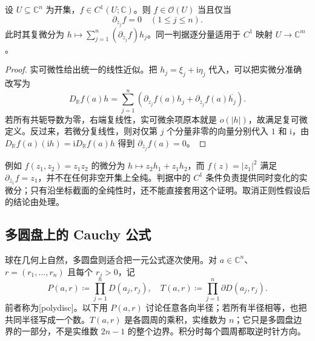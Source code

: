 \begin{proposition}\label{b3:prop:29-cauchy-riemann}
设 \(U\subseteq\mathbb C^n\) 为开集，\(f\in C^1(U;\mathbb C)\)。则 \(f\in\mathcal O(U)\) 当且仅当
\[
 \partial_{\bar z_j}f=0\quad(1\le j\le n).
\]
此时其复微分为 \(h\mapsto\sum_{j=1}^n(\partial_{z_j}f)h_j\)。同一判据逐分量适用于 \(C^1\) 映射 \(U\to\mathbb C^m\)。
\end{proposition}
\begin{proof}
实可微性给出统一的线性近似。把 \(h_j=\xi_j+\mathrm{i}\eta_j\) 代入，可以把实微分准确改写为
\[
 D_{\mathbb R}f(a)h
 =\sum_{j=1}^n\left(\partial_{z_j}f(a)h_j
                  +\partial_{\bar z_j}f(a)\overline{h_j}\right).
\]
若所有共轭导数为零，右端复线性，实可微余项原本就是 \(o(|h|)\)，故满足复可微定义。反过来，若微分复线性，则对仅第 \(j\) 个分量非零的向量分别代入 \(1\) 和 \(\mathrm{i}\)，由 \(D_{\mathbb R}f(a)(\mathrm{i}h)=\mathrm{i}D_{\mathbb R}f(a)h\) 得到 \(\partial_{\bar z_j}f(a)=0\)。
\end{proof}

例如 \(f(z_1,z_2)=z_1z_2\) 的微分为 \(h\mapsto z_2h_1+z_1h_2\)，而 \(f(z)=|z_1|^2\) 满足 \(\partial_{\bar z_1}f=z_1\)，并不在任何非空开集上全纯。判据中的 \(C^1\) 条件负责提供同时变化的实微分；只有沿坐标截面的全纯性时，还不能直接套用这个证明。取消正则性假设后的结论由处理。

\subsection{多圆盘上的 Cauchy 公式}
\label{b3:subsec:290102}

球在几何上自然，多圆盘则适合把一元公式逐次使用。对 \(a\in\mathbb C^n\)、\(r=(r_1,\ldots,r_n)\) 且每个 \(r_j>0\)，记
\[
 P(a,r)\coloneqq\prod_{j=1}^nD(a_j,r_j),
 \quad
 T(a,r)\coloneqq\prod_{j=1}^n\partial D(a_j,r_j).
\]
前者称为[polydisc]。以下用 \(P(a,r)\) 讨论任意各向半径；若所有半径相等，也把共同半径写成一个数。\(T(a,r)\) 是各圆周的乘积，实维数为 \(n\)；它只是多圆盘边界的一部分，不是实维数 \(2n-1\) 的整个边界。积分时每个圆周都取逆时针方向。

